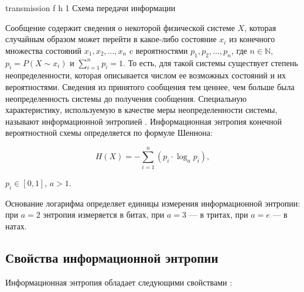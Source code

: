     {transmission}
    {f}
    {h}
    {1\textwidth}
    {Схема передачи информации}
    
Сообщение содержит сведения о некоторой физической системе $X$, которая случайным образом может перейти в какое-либо состояние $x_{i}$ из конечного множества состояний $x_{1}, x_{2}, \dots, x_{n}$ c вероятностями $p_{1}, p_{2}, \dots, p_{n}$, где $n \in \mathbb{N}$, $p_{i} = P(X \sim x_{i})$ и $\sum_{i = 1}^n p_{i} = 1$. То есть, для такой системы существует степень неопределенности, которая описывается числом ее возможных состояний и их вероятностями. Сведения из принятого сообщения тем ценнее, чем больше была неопределенность системы до получения сообщения. Специальную характеристику, используемую в качестве меры неопределенности системы, называют информационной энтропией \cite{definition}. Информационная энтропия конечной вероятностной схемы определяется по формуле Шеннона:

\begin{equation}\label{entropy}
	H(X) = -\sum_{i = 1}^n (p_{i} \cdot \log_{a}p_{i}),
\end{equation}

 $p_{i} \in [0, 1]$, $a > 1$.

Основание логарифма определяет единицы измерения информационной энтропии: при $a = 2$ энтропия измеряется в битах, при $a = 3$ --- в тритах, при $a = e$ --- в натах.

\subsection{Свойства информационной энтропии}\label{properties}

Информационная энтропия обладает следующими свойствами \cite{properties}:

